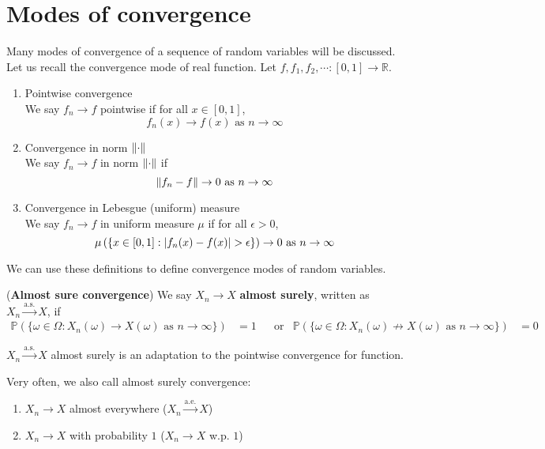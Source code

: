 \documentclass{huhtakm-template-book}
\newcommand{\prob}{\mathbb{P}}
\begin{document}
\section{Modes of convergence}
Many modes of convergence of a sequence of random variables will be discussed.\\
Let us recall the convergence mode of real function. Let $f,f_{1},f_{2},\cdots:[0,1]\to\mathbb{R}$.
\begin{enumerate}
	\item Pointwise convergence\\
	We say $f_{n}\to f$ pointwise if for all $x\in[0,1]$,
	\begin{equation*}
		f_{n}(x)\to f(x)\text{ as }n\to\infty
	\end{equation*}
	\item Convergence in norm $\lVert{\cdot}\rVert$\\
	We say $f_{n}\to f$ in norm $\lVert{\cdot}\rVert$ if
	\begin{equation*}
		\lVert{f_{n}-f}\rVert\to 0\text{ as }n\to\infty
	\end{equation*}
	\item Convergence in Lebesgue (uniform) measure\\
	We say $f_{n}\to f$ in uniform measure $\mu$ if for all $\epsilon>0$,
	\begin{equation*}
		\mu\left(\{x\in[0,1]:\abs{f_{n}(x)-f(x)}>\epsilon\}\right)\to 0\text{ as }n\to\infty
	\end{equation*}
\end{enumerate}
We can use these definitions to define convergence modes of random variables.
\begin{defn}(\textbf{Almost sure convergence})
	We say $X_{n}\to X$ \textbf{almost surely}, written as $X_{n}\xrightarrow{\text{a.s.}}X$, if
	\begin{align*}
		\prob(\{\omega\in\Omega:X_{n}(\omega)\to X(\omega)\text{ as }n\to\infty\})&=1 & &\text{or} & \prob(\{\omega\in\Omega:X_{n}(\omega)\not\to X(\omega)\text{ as }n\to\infty\})&=0
	\end{align*}
\end{defn}
\begin{rem}
	$X_{n}\xrightarrow{\text{a.s.}}X$ almost surely is an adaptation to the pointwise convergence for function.
\end{rem}
\begin{rem}
	Very often, we also call almost surely convergence:
	\begin{enumerate}
		\item $X_{n}\to X$ almost everywhere ($X_{n}\xrightarrow{\text{a.e.}}X$)
		\item $X_{n}\to X$ with probability $1$ ($X_{n}\to X$ w.p. $1$)
	\end{enumerate}
\end{rem}
\end{document}
